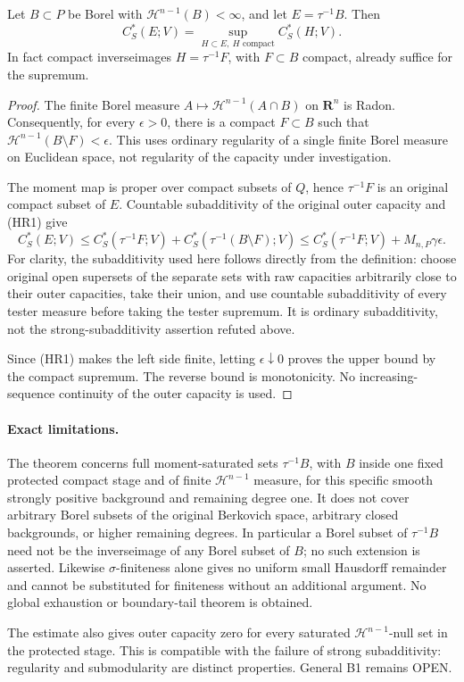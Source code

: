 \begin{theorem}
Let $B\subset P$ be Borel with $\mathcal H^{n-1}(B)<\infty$, and let
$E=\tau^{-1}B$. Then
\[
 \boxed{\quad C_S^*(E;V)
      =\sup_{H\subset E,\ H\text{ compact}}C_S^*(H;V).\quad}
 \tag{HR4}
\]
In fact compact inverseimages $H=\tau^{-1}F$, with $F\subset B$ compact,
already suffice for the supremum.
\end{theorem}
\begin{proof}
The finite Borel measure
$A\mapsto\mathcal H^{n-1}(A\cap B)$ on $\mathbf R^n$ is Radon.
Consequently, for every $\epsilon>0$, there is a compact
$F\subset B$ such that $\mathcal H^{n-1}(B\setminus F)<\epsilon$.
This uses ordinary regularity of a single finite Borel measure on
Euclidean space, not regularity of the capacity under investigation.

The moment map is proper over compact subsets of $Q$, hence
$\tau^{-1}F$ is an original compact subset of $E$. Countable
subadditivity of the original outer capacity and (HR1) give
\[
 C_S^*(E;V)
 \le C_S^*(\tau^{-1}F;V)
        +C_S^*(\tau^{-1}(B\setminus F);V)
 \le C_S^*(\tau^{-1}F;V)+M_{n,P}\gamma\epsilon.
\]
For clarity, the subadditivity used here follows directly from the
definition: choose original open supersets of the separate sets with
raw capacities arbitrarily close to their outer capacities, take their
union, and use countable subadditivity of every tester measure before
taking the tester supremum. It is ordinary subadditivity, not the
strong-subadditivity assertion refuted above.

Since (HR1) makes the left side finite, letting $\epsilon\downarrow0$
proves the upper bound by the compact supremum. The reverse bound is
monotonicity. No increasing-sequence continuity of the outer capacity
is used.
\end{proof}

\paragraph{Exact limitations.}
The theorem concerns full moment-saturated sets $\tau^{-1}B$, with $B$
inside one fixed protected compact stage and of finite
$\mathcal H^{n-1}$ measure, for this specific smooth strongly positive
background and remaining degree one. It does not cover arbitrary
Borel subsets of the original Berkovich space, arbitrary closed
backgrounds, or higher remaining degrees. In particular a Borel subset
of $\tau^{-1}B$ need not be the inverseimage of any Borel subset of $B$;
no such extension is asserted. Likewise $\sigma$-finiteness alone gives
no uniform small Hausdorff remainder and cannot be substituted for
finiteness without an additional argument. No global exhaustion or
boundary-tail theorem is obtained.

The estimate also gives outer capacity zero for every saturated
$\mathcal H^{n-1}$-null set in the protected stage. This is compatible
with the failure of strong subadditivity: regularity and submodularity
are distinct properties. General B1 remains OPEN.

